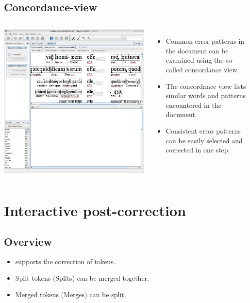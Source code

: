 \subsection{Concordance-view}
\begin{frame}
	\begin{columns}
		\includegraphics[height=.8\textheight]{../presentations/images/konkordanz_1.png}
		\begin{itemize}
			\item Common error patterns in the document can be examined using
				the so-called concordance view.
			\item The concordance view lists similar words and patterns
				encountered in the document.
			\item Consistent error patterns can be easily selected and
				corrected in one step.
		\end{itemize}
	\end{columns}
\end{frame}

\section{Interactive post-correction}
\subsection{Overview}
\begin{frame}
	\begin{itemize}
		\item \pocoto{} supports the correction of tokens.
		\item Split tokens (Splits) can be merged together.
		\item Merged tokens (Merges) can be split.
	\end{itemize}
\end{frame}

